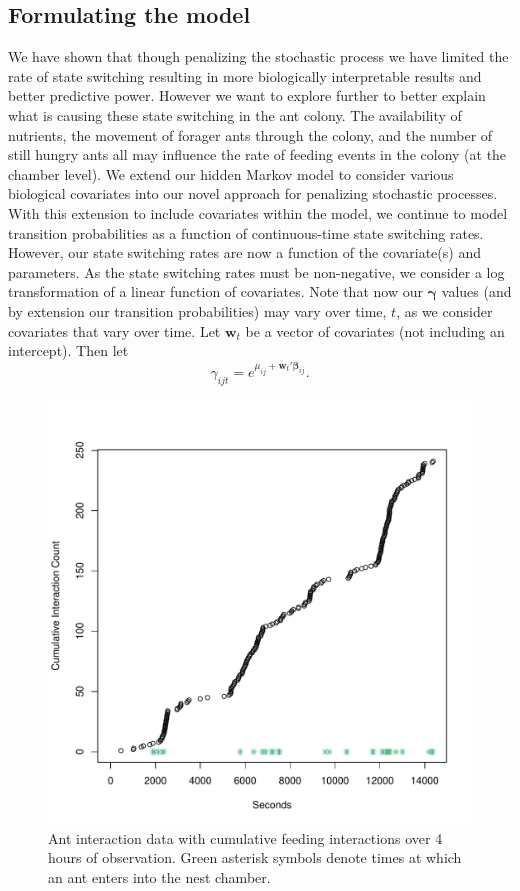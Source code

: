 \documentclass[cmbright,fleqn,referee]{envauth}
\begin{document}
\subsection{Formulating the model}
We have shown that though penalizing the stochastic process we have limited the rate of state switching resulting in more biologically interpretable results and better predictive power. However we want to explore further to better explain what is causing these state switching in the ant colony. The availability of nutrients, the movement of forager ants through the colony, and the number of still hungry ants all may influence the rate of feeding events in the colony (at the chamber level). We extend our hidden Markov model to consider various biological covariates into our novel approach for penalizing stochastic processes. 
With this extension to include covariates within the model, we continue to model transition probabilities as a function of continuous-time state switching rates. However, our state switching rates are now a function of the covariate(s) and parameters. As the state switching rates must be non-negative, we consider a log transformation of a linear function of  covariates. Note that now our $\bm{\gamma}$ values (and by extension our transition probabilities) may vary over time, $t$, as we consider covariates that vary over time. Let $\bm{w}_t$ be a vector of covariates (not including an intercept). Then let 
\begin{equation}
\gamma_{ijt} = e^{\mu_{ij} + \bm{w}_t' \bm{\beta}_{ij}}.
\end{equation}
\begin{figure}
 \centerline{\includegraphics[width=5in]{Pen2CovPlot.pdf}}
 \caption{Ant interaction data with cumulative feeding interactions over 4 hours of observation. Green asterisk symbols denote times at which an ant enters into the nest chamber.}
\label{f:pencov}
\end{figure}
\end{document}

